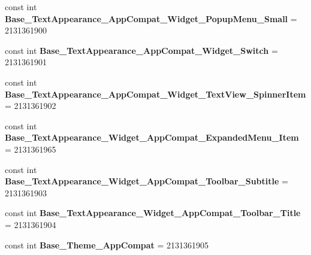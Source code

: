 \begin{DoxyCompactItemize}
\item 
\mbox{\label{class_sample_app_1_1_droid_1_1_resource_1_1_style_a0ad2dd580746b41fea125415204f0f08}} 
const int {\bfseries Base\+\_\+\+Text\+Appearance\+\_\+\+App\+Compat\+\_\+\+Widget\+\_\+\+Popup\+Menu\+\_\+\+Small} = 2131361900
\item 
\mbox{\label{class_sample_app_1_1_droid_1_1_resource_1_1_style_ae5fff9552bb6a1e8b871d9a21b7cceb5}} 
const int {\bfseries Base\+\_\+\+Text\+Appearance\+\_\+\+App\+Compat\+\_\+\+Widget\+\_\+\+Switch} = 2131361901
\item 
\mbox{\label{class_sample_app_1_1_droid_1_1_resource_1_1_style_a55b4712b0ee64f3801f30ab064bb7b79}} 
const int {\bfseries Base\+\_\+\+Text\+Appearance\+\_\+\+App\+Compat\+\_\+\+Widget\+\_\+\+Text\+View\+\_\+\+Spinner\+Item} = 2131361902
\item 
\mbox{\label{class_sample_app_1_1_droid_1_1_resource_1_1_style_a561cd3f491951a9a45f7999236fef357}} 
const int {\bfseries Base\+\_\+\+Text\+Appearance\+\_\+\+Widget\+\_\+\+App\+Compat\+\_\+\+Expanded\+Menu\+\_\+\+Item} = 2131361965
\item 
\mbox{\label{class_sample_app_1_1_droid_1_1_resource_1_1_style_af64aaf1cd08e9112cda287b28884db8c}} 
const int {\bfseries Base\+\_\+\+Text\+Appearance\+\_\+\+Widget\+\_\+\+App\+Compat\+\_\+\+Toolbar\+\_\+\+Subtitle} = 2131361903
\item 
\mbox{\label{class_sample_app_1_1_droid_1_1_resource_1_1_style_a6b70a42f2b17fa0bd49cda0ca02a85e1}} 
const int {\bfseries Base\+\_\+\+Text\+Appearance\+\_\+\+Widget\+\_\+\+App\+Compat\+\_\+\+Toolbar\+\_\+\+Title} = 2131361904
\item 
\mbox{\label{class_sample_app_1_1_droid_1_1_resource_1_1_style_aa6f1730af07cf3b840820c82b7b2f178}} 
const int {\bfseries Base\+\_\+\+Theme\+\_\+\+App\+Compat} = 2131361905
\item 
\mbox{\label{class_sample_app_1_1_droid_1_1_resource_1_1_style_a585a1dd05e11df40a33c6d5091c8452e}} 

\end{DoxyCompactItemize}
